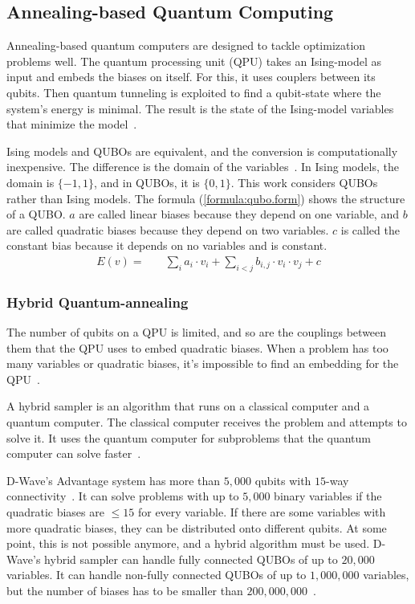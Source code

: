 \subsection{Annealing-based Quantum Computing}
\label{fundamentals:annealing}

Annealing-based quantum computers are designed to tackle optimization problems well.
The quantum processing unit (QPU) takes an Ising-model as input and embeds the biases on itself.
For this, it uses couplers between its qubits.
Then quantum tunneling is exploited to find a qubit-state where the system's energy is minimal.
The result is the state of the Ising-model variables that minimize the model~\cite{Boixo2013}.

Ising models and QUBOs are equivalent, and the conversion is computationally inexpensive.
The difference is the domain of the variables~\cite{Bian2010}.
In Ising models, the domain is $\{-1, 1\}$, and in QUBOs, it is $\{0, 1\}$.
This work considers QUBOs rather than Ising models.
The formula (\ref{formula:qubo.form}) shows the structure of a QUBO.
$a$ are called linear biases because they depend on one variable, and $b$ are called quadratic biases because they depend on two variables.
$c$ is called the constant bias because it depends on no variables and is constant.
\begin{align}
  \label{formula:qubo.form}
  E(v) = & \quad
  \sum_i a_i \cdot v_i
  + \sum_{i < j} b_{i, j} \cdot v_i \cdot v_j
  + c
\end{align}

\subsubsection{Hybrid Quantum-annealing}

The number of qubits on a QPU is limited, and so are the couplings between them that the QPU uses to embed quadratic biases.
When a problem has too many variables or quadratic biases, it's impossible to find an embedding for the QPU~\cite{Bernoudy2020}.

A hybrid sampler is an algorithm that runs on a classical computer and a quantum computer.
The classical computer receives the problem and attempts to solve it.
It uses the quantum computer for subproblems that the quantum computer can solve faster~\cite{Zhang2016}.

D-Wave's Advantage system has more than $5, 000$ qubits with $15$-way connectivity~\cite{D-Wave2020}.
It can solve problems with up to $5, 000$ binary variables if the quadratic biases are $\leq 15$ for every variable.
If there are some variables with more quadratic biases, they can be distributed onto different qubits.
At some point, this is not possible anymore, and a hybrid algorithm must be used.
D-Wave's hybrid sampler can handle fully connected QUBOs of up to $20, 000$ variables.
It can handle non-fully connected QUBOs of up to $1, 000, 000$ variables, but the number of biases has to be smaller than $200, 000, 000$~\cite{Bernoudy2020}.

